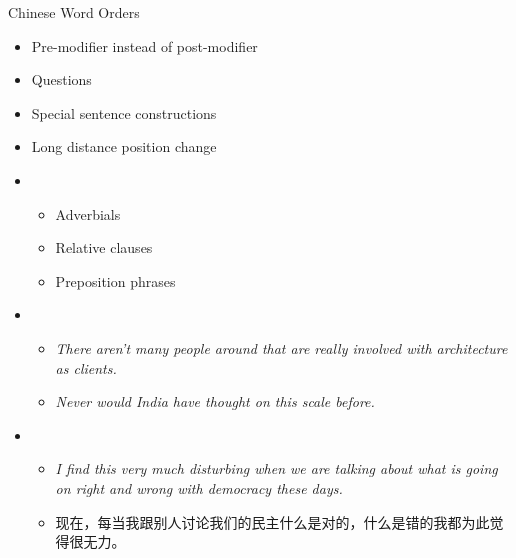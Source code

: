 \documentclass[18pt]{beamer}
\newcommand{\cntext}[1]{\begin{CJK}{UTF8}{gbsn}#1\end{CJK}}
\begin{document}
\begin{frame}{Chinese Word Orders}
\begin{itemize}[<+-| alert@+>]
\item Pre-modifier instead of post-modifier
\item Questions
\item Special sentence constructions
\item Long distance position change
\end{itemize}
\begin{overprint}
\vspace{-2cm}
\begin{itemize}
\item[]
\begin{itemize}
	\item Adverbials
	\item Relative clauses
	\item Preposition phrases
\end{itemize}
\end{itemize}	
\begin{figure}
\centering

\end{figure}
\vspace{-1.2cm}
\begin{figure}
\centering

\end{figure}
\begin{itemize}
\item[]
\begin{itemize}
\item[] \textit{\alert{There aren't} many people around that are really involved with architecture as clients.} \bigskip \\
\item[] \textit{\alert{Never would} India have thought on this scale before.}
\end{itemize}
\end{itemize}
\begin{itemize}
\item[]
\begin{itemize}
\item[] \textit{I find this very much disturbing \alert{when we are talking about what is going on right and wrong with democracy these days}.} \bigskip \\
\item[] \cntext{\alert{现在，每当我跟别人讨论我们的民主什么是对的，什么是错的}我都为此觉得很无力。}
\end{itemize}
\end{itemize}
\end{overprint}
\end{frame}
\end{document}
